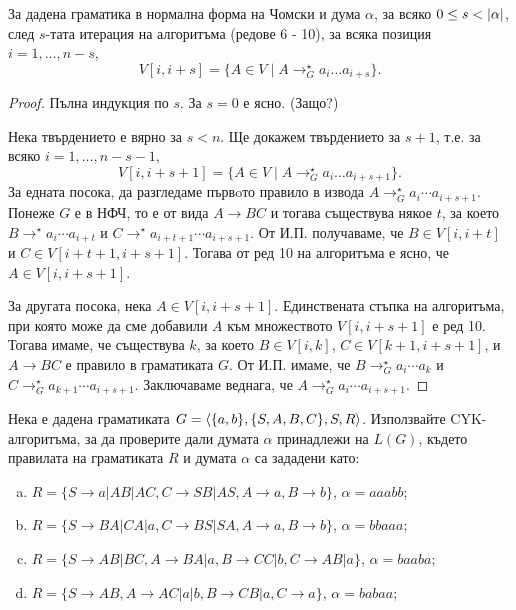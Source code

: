 \begin{lemma}
  За дадена граматика в нормална форма на Чомски и дума $\alpha$, 
  за всяко $0 \leq s < \lvert{\alpha}\rvert$, след $s$-тата итерация на алгоритъма (редове 6 - 10), за всяка позиция $i = 1,\dots,n-s$,
  \[V[i,i+s] = \{A \in V \mid A \rightarrow^\star_G a_i\dots a_{i+s}\}.\]
\end{lemma}
\begin{proof}
  Пълна индукция по $s$.
  За $s = 0$  е ясно. (Защо?)

  Нека твърдението е вярно за $s < n$. Ще докажем твърдението за $s+1$, т.е. за всяко $i = 1,\dots,n-s-1$,
  \[V[i,i+s+1] = \{A \in V \mid A \rightarrow^\star_G a_i\dots a_{i+s+1}\}.\]
  За едната посока, да разгледаме първoто правило в извода $A \to^\star_G a_i\cdots a_{i+s+1}$.
  Понеже $G$ е в НФЧ, то е от вида $A \to BC$ и тогава съществува някое $t$, за което 
  $B \to^\star a_i\cdots a_{i+t}$ и $C \to^\star a_{i+t+1}\cdots a_{i+s+1}$.
  От И.П. получаваме, че $B \in V[i,i+t]$ и $C \in V[i+t+1,i+s+1]$.
  Тогава от ред 10 на алгоритъма е ясно, че $A \in V[i,i+s+1]$.
  
  За другата посока, нека $A \in V[i,i+s+1]$.
  Единствената стъпка на алгоритъма, при която може да сме добавили $A$ към множеството $V[i,i+s+1]$ е ред 10.
  Тогава имаме, че съществува $k$, за което $B \in V[i,k]$, $C \in V[k+1,i+s+1]$, и $A\to BC$ е правило в граматиката $G$.
  От И.П. имаме, че $B \to^\star_G a_i\cdots a_k$ и $C \to^\star_G a_{k+1}\cdots a_{i+s+1}$.
  Заключаваме веднага, че $A \to^\star_G a_i\cdots a_{i+s+1}$.
\end{proof}

\begin{problem}
  Нека е дадена граматиката $G = \langle{\{a,b\}, \{S,A,B,C\},S,R}\rangle$.
  Използвайте CYK-алгоритъма, за да проверите дали
  думата $\alpha$ принадлежи на $L(G)$, където правилата на граматиката $R$ и думата $\alpha$
  са зададени като:
  \begin{enumerate}[a)]
  \item
    $R =\{S\rightarrow a| AB|AC, C\rightarrow SB|AS,A\rightarrow a, B\rightarrow b\}$, $\alpha=aaabb$;
  \item
    $R = \{S\rightarrow BA| CA|a, C\rightarrow BS|SA,A\rightarrow a, B\rightarrow b\}$, $\alpha=bbaaa$;
  \item
    $R =\{S\rightarrow AB|BC, A\rightarrow BA|a,B\rightarrow CC|b, C\rightarrow AB|a\}$, $\alpha=baaba$;
  \item
    $R = \{S\rightarrow AB, A\rightarrow AC|a|b,B\rightarrow CB|a, C\rightarrow a\}$, $\alpha=babaa$;
  \end{enumerate}
\end{problem}

